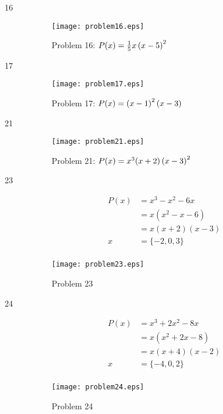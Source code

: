 \documentclass[landscape]{exam}
\begin{document}
\begin{description}
    \item[16]
      \begin{figure}[H]
        \centering
        \texttt{[image: problem16.eps]}
        \caption*{Problem 16: $P(x) = \frac{1}{5} x \del{x - 5}^2$}
      \end{figure}

    \item[17]
      \begin{figure}[H]
        \centering
        \texttt{[image: problem17.eps]}
        \caption*{Problem 17: $P(x) = \del{x - 1}^2(x - 3)$}
      \end{figure}

    \item[21]
      \begin{figure}[H]
        \centering
        \texttt{[image: problem21.eps]}
        \caption*{Problem 21: $P(x) = x^3(x + 2)\del{x - 3}^2$}
      \end{figure}

    \item[23] 
      \begin{align*}
        P(x) &= x^3 - x^2 - 6x \\
             &= x(x^2 - x - 6) \\
             &= x(x + 2)(x - 3) \\
        x    &= \{ -2, 0, 3 \} \\
      \end{align*}
      
      \begin{figure}[H]
        \centering
        \texttt{[image: problem23.eps]}
        \caption*{Problem 23}
      \end{figure}

    \item[24] 
      \begin{align*}
        P(x) &= x^3 + 2x^2 - 8x \\
             &= x(x^2 + 2x - 8) \\
             &= x(x + 4)(x - 2) \\
        x    &= \{ -4, 0, 2 \} \\
      \end{align*}
      
      \begin{figure}[H]
        \centering
        \texttt{[image: problem24.eps]}
        \caption*{Problem 24}
      \end{figure}


\end{description}
\end{document}
